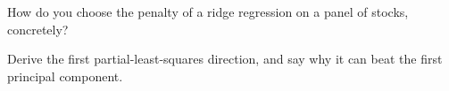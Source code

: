 \begin{interviewq}\label{iq:ml:linear-and-regularised-baselines:5}
How do you choose the penalty of a ridge regression on a panel of stocks, concretely?
\end{interviewq}

\begin{interviewq}\label{iq:ml:linear-and-regularised-baselines:6}
Derive the first partial-least-squares direction, and say why it can beat the first principal component.
\end{interviewq}

